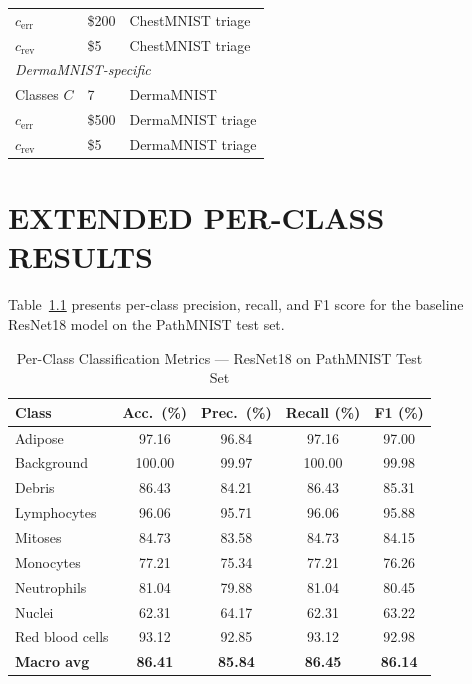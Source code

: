 \documentclass[12pt,a4paper]{report}
\begin{document}
\begin{table}[H]
\begin{tabular}{lll}
$c_{\text{err}}$     & \$200                  & ChestMNIST triage \\
$c_{\text{rev}}$     & \$5                    & ChestMNIST triage \\
\midrule
\multicolumn{3}{l}{\textit{DermaMNIST-specific}} \\
Classes $C$          & 7                      & DermaMNIST \\
$c_{\text{err}}$     & \$500                  & DermaMNIST triage \\
$c_{\text{rev}}$     & \$5                    & DermaMNIST triage \\
\bottomrule
\end{tabular}
\end{table}

\chapter{EXTENDED PER-CLASS RESULTS}
\label{app:perclass}

Table~\ref{tab:app_perclass_path} presents per-class precision, recall, and F1 score
for the baseline ResNet18 model on the PathMNIST test set.

\begin{table}[H]
\footnotesize
\centering
\caption{Per-Class Classification Metrics — ResNet18 on PathMNIST Test Set}
\label{tab:app_perclass_path}
\begin{tabular}{lcccc}
\toprule
\textbf{Class} & \textbf{Acc.\ (\%)} & \textbf{Prec.\ (\%)} & \textbf{Recall (\%)} & \textbf{F1 (\%)} \\
\midrule
Adipose            & 97.16 & 96.84 & 97.16 & 97.00 \\
Background         & 100.00 & 99.97 & 100.00 & 99.98 \\
Debris             & 86.43 & 84.21 & 86.43 & 85.31 \\
Lymphocytes        & 96.06 & 95.71 & 96.06 & 95.88 \\
Mitoses            & 84.73 & 83.58 & 84.73 & 84.15 \\
Monocytes          & 77.21 & 75.34 & 77.21 & 76.26 \\
Neutrophils        & 81.04 & 79.88 & 81.04 & 80.45 \\
Nuclei             & 62.31 & 64.17 & 62.31 & 63.22 \\
Red blood cells    & 93.12 & 92.85 & 93.12 & 92.98 \\
\midrule
\textbf{Macro avg} & \textbf{86.41} & \textbf{85.84} & \textbf{86.45} & \textbf{86.14} \\
\bottomrule
\end{tabular}
\end{table}
\end{document}
